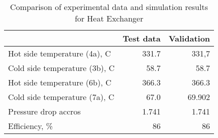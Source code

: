\begin{table}
\label{tab:Comparison}
\caption{Comparison of experimental data and simulation results for Heat Exchanger}
\begin{center}
\begin{tabulary}{0.9\textwidth}{LRR}
\toprule
& Test data \cite{Iverson_2013}  & Validation \\
\midrule
Hot side temperature (4a), C & 331.7 & 331,7 \\
Cold side temperature (3b), C & 58.7 & 58.7 \\
Hot side temperature (6b), C & 366.3 & 366.3 \\
Cold side temperature (7a), C & 67.0 & 69.902 \\
Pressure drop accros  & 1.741 & 1.741 \\
Efficiency, \% & 86 & 86 \\
\bottomrule
\end{tabulary}
\end{center}
\end{table}